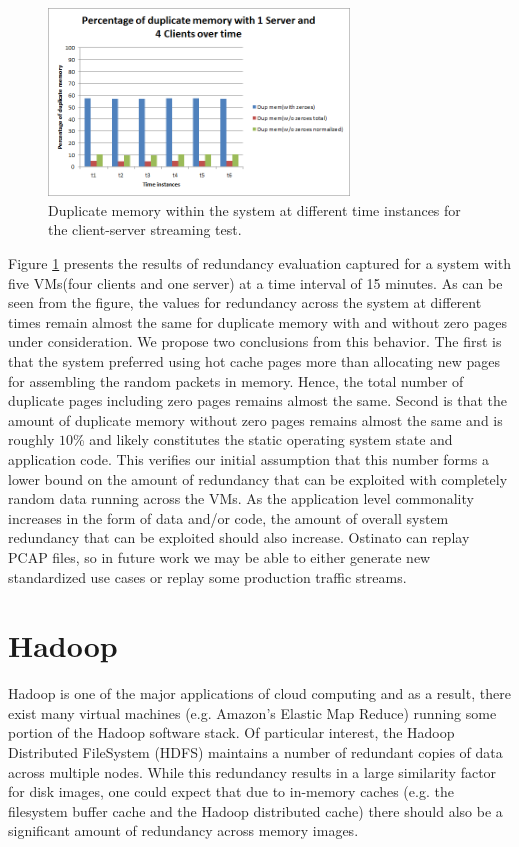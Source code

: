 \documentclass{acm_proc_article-sp}
\begin{document}
\begin{figure}[htbp]
\centering
        \includegraphics[width=8cm]{images/client-server2.png}
    \caption{Duplicate memory within the system at different time instances for the client-server streaming test.}
    \label{fig:client-server2}
\end{figure}

Figure \ref{fig:client-server2} presents the results of redundancy evaluation captured for a system with five VMs(four clients and one server) at a time interval of 15 minutes. As can be seen from the figure, the values for redundancy across the system at different times remain almost the same for duplicate memory with and without zero pages under consideration. We propose two conclusions from this behavior. The first is that the system preferred using hot cache pages more than allocating new pages for assembling the random packets in memory. Hence, the total number of duplicate pages including zero pages remains almost the same. Second is that the amount of duplicate memory without zero pages remains almost the same and is roughly $10$\% and likely constitutes the static operating system state and application code. This verifies our initial assumption that this number forms a lower bound on the amount of redundancy that can be exploited with completely random data running across the VMs. As the application level commonality increases in the form of data and/or code, the amount of overall system redundancy that can be exploited should also increase.  Ostinato can replay PCAP files, so in future work we may be able to either generate new standardized use cases or replay some production traffic streams.

\section{Hadoop}
Hadoop is one of the major applications of cloud computing and as a result, there exist many virtual machines (e.g. Amazon's Elastic Map Reduce) running some portion of the Hadoop software stack.  Of particular interest, the Hadoop Distributed FileSystem (HDFS) maintains a number of redundant copies of data across multiple nodes.  While this redundancy results in a large similarity factor for disk images, one could expect that due to in-memory caches (e.g. the filesystem buffer cache and the Hadoop distributed cache) there should also be a significant amount of redundancy across memory images.  
\end{document}
